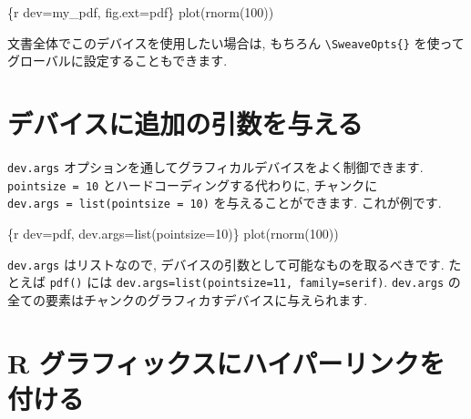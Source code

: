 \documentclass[
  lualatex,ja=standard,jafont=noto-otf]{bxjsreport}
\newenvironment{Shaded}{\begin{snugshade}}{\end{snugshade}}
\newcommand{\AttributeTok}[1]{\textcolor[rgb]{0.77,0.63,0.00}{#1}}
\newcommand{\StringTok}[1]{\textcolor[rgb]{0.31,0.60,0.02}{#1}}
\begin{document}
\begin{Shaded}
\begin{Highlighting}[]
\StringTok{\textasciigrave{}\textasciigrave{}\textasciigrave{}}\AttributeTok{\{r dev=\textquotesingle{}my\_pdf\textquotesingle{}, fig.ext=\textquotesingle{}pdf\textquotesingle{}\}}
\AttributeTok{plot(rnorm(100))}
\StringTok{\textasciigrave{}\textasciigrave{}\textasciigrave{}}
\end{Highlighting}
\end{Shaded}

文書全体でこのデバイスを使用したい場合は, もちろん
\texttt{\textbackslash{}SweaveOpts\{\}}
を使ってグローバルに設定することもできます.

\hypertarget{ux30c7ux30d0ux30a4ux30b9ux306bux8ffdux52a0ux306eux5f15ux6570ux3092ux4e0eux3048ux308b}{%
\section*{デバイスに追加の引数を与える}\label{ux30c7ux30d0ux30a4ux30b9ux306bux8ffdux52a0ux306eux5f15ux6570ux3092ux4e0eux3048ux308b}}

\texttt{dev.args}
オプションを通してグラフィカルデバイスをよく制御できます.
\texttt{pointsize\ =\ 10} とハードコーディングする代わりに, チャンクに
\texttt{dev.args\ =\ list(pointsize\ =\ 10)} を与えることができます.
これが例です.

\begin{Shaded}
\begin{Highlighting}[]
\StringTok{\textasciigrave{}\textasciigrave{}\textasciigrave{}}\AttributeTok{\{r dev=\textquotesingle{}pdf\textquotesingle{}, dev.args=list(pointsize=10)\}}
\AttributeTok{plot(rnorm(100))}
\StringTok{\textasciigrave{}\textasciigrave{}\textasciigrave{}}
\end{Highlighting}
\end{Shaded}

\texttt{dev.args} はリストなので,
デバイスの引数として可能なものを取るべきです. たとえば \texttt{pdf()}
には
\texttt{dev.args=list(pointsize=11,\ family=\textquotesingle{}serif\textquotesingle{})}.
\texttt{dev.args}
の全ての要素はチャンクのグラフィカすデバイスに与えられます.

\hypertarget{r-ux30b0ux30e9ux30d5ux30a3ux30c3ux30afux30b9ux306bux30cfux30a4ux30d1ux30fcux30eaux30f3ux30afux3092ux4ed8ux3051ux308b}{%
\section*{R
グラフィックスにハイパーリンクを付ける}\label{r-ux30b0ux30e9ux30d5ux30a3ux30c3ux30afux30b9ux306bux30cfux30a4ux30d1ux30fcux30eaux30f3ux30afux3092ux4ed8ux3051ux308b}}
\end{document}
